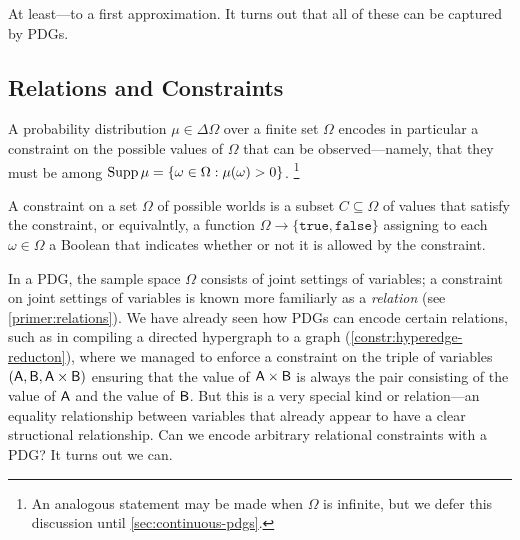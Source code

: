 At least---to a first approximation. 
It turns out that all of these can be captured by PDGs. 


\subsection{Relations and Constraints}
\label{sec:relation-widget}

A probability distribution $\mu \in \Delta \Omega$ over 
    a finite set $\Omega$ encodes in particular a constraint
    on the possible values of $\Omega$ that can be observed---namely, that
they must be among $\operatorname{\mathrm{Supp}} \mu = \{ \omega \in \Omega : \mu(\omega) > 0 \}$. 
\unskip\footnote{An analogous statement may be made when $\Omega$ is infinite, 
    but we defer this discussion until \cref{sec:continuous-pdgs}.}


A constraint on a set $\Omega$ of possible worlds is a subset $C \subseteq \Omega$
of values that satisfy the constraint, or equivalntly, 
a function $\Omega \to \{\mathtt{true}, \mathtt{false}\}$ assigning to each $\omega \in \Omega$ a Boolean that indicates whether or not it is allowed by the constraint. 
    
In a PDG, the sample space $\Omega$ consists of joint settings of
variables;
a constraint on joint settings of variables is known more familiarly as a
\emph{relation} (see \cref{primer:relations}).
We have already seen how PDGs can encode certain relations, such as
in compiling a directed hypergraph to a graph (\cref{constr:hyperedge-reducton}),
where we managed to enforce a constraint on the triple of variables $(\mathsf{A}, \mathsf{B}, \mathsf{A}\times \mathsf{B})$ ensuring that the value of $\mathsf{A} \times \mathsf{B}$ is always the pair consisting of the value of $\mathsf{A}$ and the value of $\mathsf{B}$.
But this is a very special kind or relation---an equality relationship between variables that already appear to have a clear structional relationship.
Can we encode arbitrary relational constraints with a PDG? 
It turns out we can.

